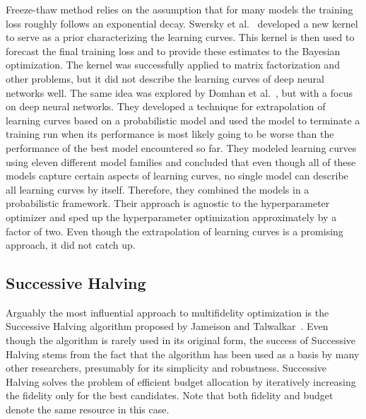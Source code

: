 Freeze-thaw method relies on the assumption that for many models the training loss roughly follows an exponential decay. Swersky et al.~\cite{swersky2014freeze} developed a new kernel to serve as a prior characterizing the learning curves. This kernel is then used to forecast the final training loss and to provide these estimates to the Bayesian optimization. The kernel was successfully applied to matrix factorization and other problems, but it did not describe the learning curves of deep neural networks well. The same idea was explored by Domhan et al.~\cite{domhan2015speeding}, but with a focus on deep neural networks. They developed a technique for extrapolation of learning curves based on a probabilistic model and used the model to terminate a training run when its performance is most likely going to be worse than the performance of the best model encountered so far. They modeled learning curves using eleven different model families and concluded that even though all of these models capture certain aspects of learning curves, no single model can describe all learning curves by itself. Therefore, they combined the models in a probabilistic framework. Their approach is agnostic to the hyperparameter optimizer and sped up the hyperparameter optimization approximately by a factor of two. Even though the extrapolation of learning curves is a promising approach, it did not catch up.

\subsection{Successive Halving}
 Arguably the most influential approach to multifidelity optimization is the Successive Halving algorithm proposed by Jameison and Talwalkar~\cite{jamieson16}. Even though the algorithm is rarely used in its original form, the success of Successive Halving stems from the fact that the algorithm has been used as a basis by many other researchers, presumably for its simplicity and robustness. Successive Halving solves the problem of efficient budget allocation by iteratively increasing the fidelity only for the best candidates. Note that both fidelity and budget denote the same resource in this case.

